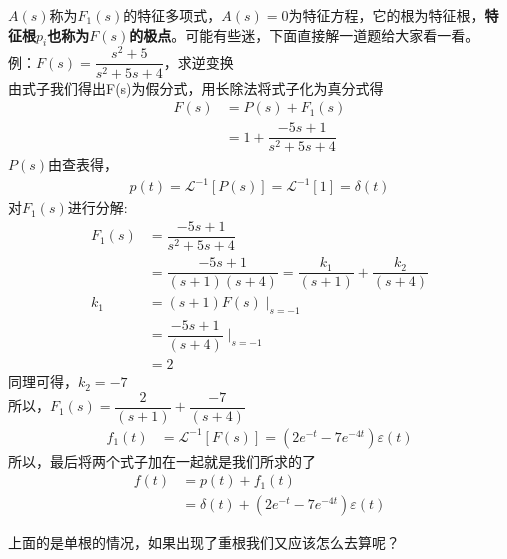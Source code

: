 \documentclass[UTF8,a4paper,12pt]{ctexart}
\begin{document}
\begin{flushleft}
\begin{notitlebox}
     
      \begin{flushleft}
        $A(s)$称为$F_1(s)$的特征多项式，$A(s)=0$为特征方程，它的根为特征根，\textbf{特征根$p_i$也称为$F(s)$的极点}。可能有些迷，下面直接解一道题给大家看一看。
        \vspace{1cm}
        \\例：$F(s)=\dfrac{s^2+5}{s^2
        +5s+4}$，求逆变换
        \\由式子我们得出F(s)为假分式，用长除法将式子化为真分式得
        \begin{align*}
          F(s)&=P(s)+F_1(s)\\
              &=1+\dfrac{-5s+1}{s^2+5s+4}
        \end{align*}
        $P(s)$由查表得，
        \begin{align*}
          p(t)=\mathcal{L}^{-1}[P(s)]= \mathcal{L}^{-1}[1]=\delta(t)
        \end{align*}
        对$F_1(s)$进行分解:
        \begin{align*}
          F_1(s)&=\dfrac{-5s+1}{s^2+5s+4}\\
              &=\dfrac{-5s+1}{(s+1)(s+4)}=\dfrac{k_1}{(s+1)}+\dfrac{k_2}{(s+4)}\\
            k_1&=(s+1)F(s)\mid_{s=-1}^{}\\
              &=\dfrac{-5s+1}{(s+4)}\mid_{s=-1}^{}\\  
              &=2
        \end{align*}
        同理可得，$k_2=-7$
        \\所以，$F_1(s)=\dfrac{2}{(s+1)}+\dfrac{-7}{(s+4)}$
        \begin{align*}
          f_1(t)&=\mathcal{L}^{-1}[F(s)]=(2e^{-t}-7e^{-4t})\varepsilon (t)
        \end{align*}
        所以，最后将两个式子加在一起就是我们所求的了
        \begin{align*}
          f(t)&=p(t)+f_1(t)\\
               &=\delta(t)+(2e^{-t}-7e^{-4t})\varepsilon (t)
        \end{align*}
      \end{flushleft}
    \end{notitlebox}
    上面的是单根的情况，如果出现了重根我们又应该怎么去算呢？
    

\end{flushleft}
\end{document}
